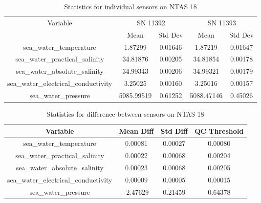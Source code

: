 \begin{table}[h]
\centering
\begin{tabular}{|c|c|c|c|c|}
\hline
Variable & \multicolumn{2}{c|}{SN 11392} & \multicolumn{2}{c|}{SN 11393} \\
& Mean & Std Dev & Mean & Std Dev \\
\hline
sea\_water\_temperature & 1.87299 & 0.01646 & 1.87219 & 0.01647 \\
sea\_water\_practical\_salinity & 34.81876 & 0.00205 & 34.81854 & 0.00178 \\
sea\_water\_absolute\_salinity & 34.99343 & 0.00206 & 34.99321 & 0.00179 \\
sea\_water\_electrical\_conductivity & 3.25025 & 0.00160 & 3.25016 & 0.00157 \\
sea\_water\_pressure & 5085.99519 & 0.61252 & 5088.47146 & 0.45026 \\
\hline
\end{tabular}
\caption{Statistics for individual sensors on NTAS 18}
\end{table}

\begin{table}[h]
\centering
\begin{tabular}{|c|c|c|c|}
\hline
Variable & Mean Diff & Std Diff & QC Threshold \\
\hline
sea\_water\_temperature & 0.00081 & 0.00027 & 0.00080 \\
sea\_water\_practical\_salinity & 0.00022 & 0.00068 & 0.00204 \\
sea\_water\_absolute\_salinity & 0.00023 & 0.00068 & 0.00205 \\
sea\_water\_electrical\_conductivity & 0.00009 & 0.00005 & 0.00015 \\
sea\_water\_pressure & -2.47629 & 0.21459 & 0.64378 \\
\hline
\end{tabular}
\caption{Statistics for difference between sensors on NTAS 18}
\end{table}
